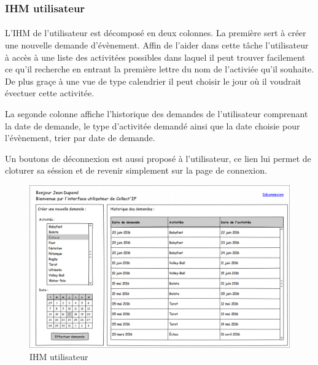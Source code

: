 \documentclass[a4paper,11pt]{article}
\begin{document}
\pagebreak
\subsubsection{IHM utilisateur}

\paragraph{}
L'IHM de l'utilisateur est décomposé en deux colonnes. La première sert à créer une nouvelle demande d'évènement. Affin de l'aider dans cette tâche l'utilisateur à accès à une liste des activitées possibles dans laquel il peut trouver facilement ce qu'il recherche en entrant la première lettre du nom de l'activiée qu'il souhaite. De plus graçe à une vue de type calendrier il peut choisir le jour où il voudrait évectuer cette activitée.

La segonde colonne affiche l'historique des demandes de l'utilisateur comprenant la date de demande, le type d'activitée demandé ainsi que la date choisie pour l'évènement, trier par date de demande.

Un boutons de déconnexion est aussi proposé à l'utilisateur, ce lien lui permet de cloturer sa séssion et de revenir simplement sur la page de connexion.

\begin{figure}[H]
  \begin{center}
    \includegraphics[width=15cm]{../../IHM/IHM_utilisateur.png}
    \caption{IHM utilisateur}
  \end{center}
\end{figure}
\end{document}
